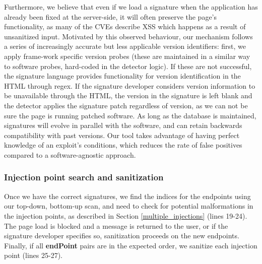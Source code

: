 Furthermore, we believe that even if we load a signature when the application has already been fixed at the server-side, it will often preserve the page's functionality, as many of the CVEs describe XSS which happens as a result of unsanitized input. Motivated by this observed behaviour, our mechanism follows a series of increasingly accurate but less applicable version identifiers: first, we apply frame-work specific version probes (these are maintained in a similar way to software probes, hard-coded in the detector logic). If these are not successful, the signature language provides functionality for version identification in the HTML through regex. If the signature developer considers version information to be unavailable through the HTML, the version in the signature is left blank and the detector applies the signature patch regardless of version, as we can not be sure the page is running patched software. As long as the database is maintained, signatures will evolve in parallel with the software, and can retain backwards compatibility with past versions. Our tool takes advantage of having perfect knowledge of an exploit's conditions, which reduces the rate of false positives compared to a software-agnostic approach.

 
\subsubsection{Injection point search and sanitization} \label{search_and_sanitization}
Once we have the correct signatures, we find the indices for the endpoints using our top-down, bottom-up scan, and need to check for potential malformations in the injection points, as described in Section \ref{multiple_injections} (lines 19-24). The page load is blocked and a message is returned to the user, or if the signature developer specifies so, sanitization proceeds on the new endpoints. Finally, if all \textbf{endPoint} pairs are in the expected order, we sanitize each injection point (lines 25-27).
